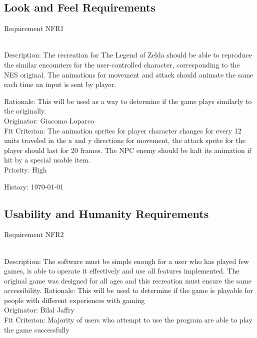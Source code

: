 \documentclass[12pt, titlepage]{article}
\begin{document}
\subsection{Look and Feel Requirements}
\begin{enumerate}
{\color{blue}\item Requirement NFR1}\\
{\color{blue} Description:} The recreation for The Legend of Zelda should be able to reproduce the similar encounters for the user-controlled character, corresponding to the NES original. The animations for movement and attack should animate the same each time an input is sent by player. 

 {\color{blue}Rationale: This will be used as a way to determine if the game plays similarly to the originally.}\\
 
 {\color{blue}Originator: Giacomo Loparco}\\
 
  {\color{blue}Fit Criterion: The animation sprites for player character changes for every 12 units traveled in the x and y directions for movement, the attack sprite for the player should last for 20 frames. The NPC enemy should be halt its animation if hit by a special usable item.}\\
  
  {\color{blue}Priority: High}
  
  {\color{blue}History: \today}

\subsection{Usability and Humanity Requirements}
{\color{blue}\item Requirement NFR2}\\
{\color{blue} Description:} The software must be simple enough for a user who has played few games, is able to operate it effectively and use all features implemented. The original game was designed for all ages and this recreation must ensure the same accessibility.
{\color{blue}Rationale: This will be used to determine if the game is playable for people with different experiences with gaming}\\

{\color{blue}Originator: Bilal Jaffry}\\

{\color{blue}Fit Criterion: Majority of users who attempt to use the program are able to play the game successfully}\\


\end{enumerate}
\end{document}
